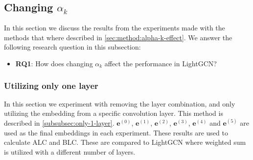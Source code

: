 \subsection{Changing $\alpha_k$}
In this section we discuss the results from the experiments made with the methods that where described in \autoref{sec:method:alpha-k-effect}.
We answer the following research question in this subsection:
\begin{itemize}
    \item \textbf{RQ1}: How does changing $\alpha_k$ affect the performance in LightGCN?
\end{itemize}

\subsubsection{Utilizing only one layer}
In this section we experiment with removing the layer combination, and only utilizing the embedding from a specific convolution layer.
This method is described in \autoref{subsubsec:only-1-layer}.
$\mathbf{e}^{(0)}$, $\mathbf{e}^{(1)}$, $\mathbf{e}^{(2)}$, $\mathbf{e}^{(3)}$, $\mathbf{e}^{(4)}$ and $\mathbf{e}^{(5)}$ are used as the final embeddings in each experiment.
These results are used to calculate ALC and BLC.
These are compared to LightGCN where weighted sum is utilized with a different number of layers.
